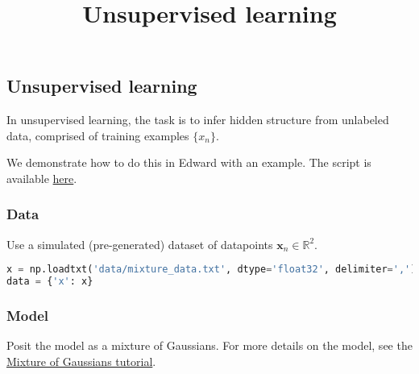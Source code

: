 \title{Unsupervised learning}

\subsection{Unsupervised learning}

In unsupervised learning, the task is to infer hidden structure from
unlabeled data, comprised of training examples $\{x_n\}$.

We demonstrate how to do this in Edward with an example.
The script is available
\href{https://github.com/blei-lab/edward/blob/master/examples/mixture_gaussian.py}
{here}.


\subsubsection{Data}

Use a simulated (pre-generated) dataset of datapoints
$\mathbf{x}_n\in\mathbb{R}^2$.
\begin{lstlisting}[language=Python]
x = np.loadtxt('data/mixture_data.txt', dtype='float32', delimiter=',')
data = {'x': x}
\end{lstlisting}


\subsubsection{Model}

Posit the model as a mixture of Gaussians. For more details on the
model, see the
\href{tut_mixture_gaussian}
{Mixture of Gaussians tutorial}.


